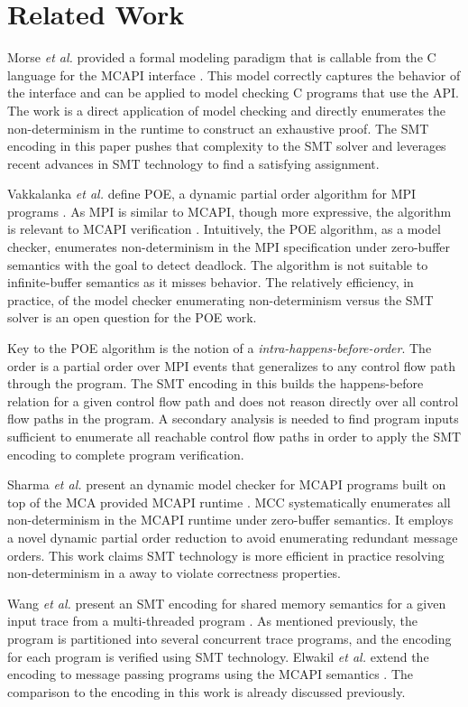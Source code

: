 \section{Related Work}
Morse \emph{et al.} provided a formal modeling paradigm that is callable from
the C language for the MCAPI interface \cite{morse:vmcai12}. This
model correctly captures the behavior of the interface and can be
applied to model checking C programs that use the API. The work is a
direct application of model checking and directly enumerates the
non-determinism in the runtime to construct an exhaustive proof. The
SMT encoding in this paper pushes that complexity to the SMT solver
and leverages recent advances in SMT technology to find a satisfying
assignment.

Vakkalanka \emph{et al.} define POE, a dynamic partial order algorithm for
MPI programs \cite{sarvani:fm09, flanagan:popl05}. As MPI is similar
to MCAPI, though more expressive, the algorithm is relevant to MCAPI
verification \cite{mpi}. Intuitively, the POE algorithm, as a model
checker, enumerates non-determinism in the MPI specification under
zero-buffer semantics with the goal to detect deadlock. The algorithm
is not suitable to infinite-buffer semantics as it misses
behavior. The relatively efficiency, in practice, of the model checker
enumerating non-determinism versus the SMT solver is an open question
for the POE work.

Key to the POE algorithm is the notion of a
\textit{intra-happens-before-order}. The order is a partial order over
MPI events that generalizes to any control flow path through the
program.  The SMT encoding in this builds the happens-before relation
for a given control flow path and does not reason directly over all
control flow paths in the program. A secondary analysis is needed to
find program inputs sufficient to enumerate all reachable control flow
paths in order to apply the SMT encoding to complete program
verification.

Sharma \emph{et al.} present an dynamic model checker for MCAPI programs built
on top of the MCA provided MCAPI runtime \cite{sharma:fmcad09}. MCC
systematically enumerates all non-determinism in the MCAPI runtime
under zero-buffer semantics. It employs a novel dynamic partial order
reduction to avoid enumerating redundant message orders. This work
claims SMT technology is more efficient in practice resolving
non-determinism in a away to violate correctness properties.

Wang \emph{et al.} present an SMT encoding for shared memory semantics for a
given input trace from a multi-threaded program \cite{wang:fse09}. As
mentioned previously, the program is partitioned into several
concurrent trace programs, and the encoding for each program is
verified using SMT technology. Elwakil \emph{et al.} extend the encoding to
message passing programs using the MCAPI semantics
\cite{elwakil:atva10,elwakil:padtad10}. The comparison to the encoding
in this work is already discussed previously.


